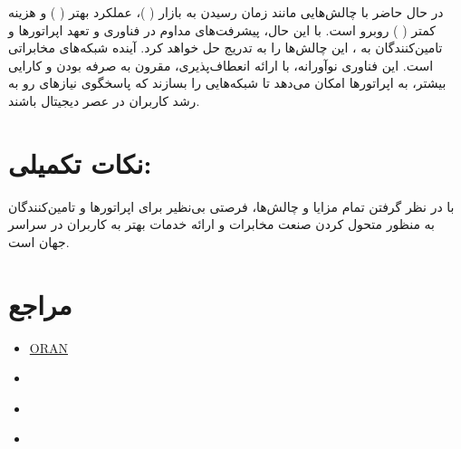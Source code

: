 \documentclass[landscape, 12pt]{report}
\begin{document}
 در حال حاضر با چالش‌هایی مانند زمان رسیدن به بازار (
 )، عملکرد بهتر (
 ) و هزینه کمتر (
 ) روبرو است. با این حال، پیشرفت‌های مداوم در فناوری و تعهد اپراتورها و تامین‌کنندگان به
  ، این چالش‌ها را به تدریج حل خواهد کرد.
 آینده شبکه‌های مخابراتی است. این فناوری نوآورانه، با ارائه انعطاف‌پذیری، مقرون به صرفه بودن و کارایی بیشتر، به اپراتورها امکان می‌دهد تا شبکه‌هایی را بسازند که پاسخگوی نیازهای رو به رشد کاربران در عصر دیجیتال باشند.
\section*{نکات تکمیلی:}

با در نظر گرفتن تمام مزایا و چالش‌ها،
   فرصتی بی‌نظیر برای اپراتورها و تامین‌کنندگان به منظور متحول کردن صنعت مخابرات و ارائه خدمات بهتر به کاربران در سراسر جهان است.

\section* {مراجع}
\begin{itemize}
	\item 
	\href{https://www.youtube.com/watch?v=Z9kJ8HT\_IVM} {ORAN}
	
	\item 
	\href{https://www.vmware.com/topics/glossary/content/vran-oran.html?resource=cat-1324900800#cat-1324900800}{}
	
	\item 
	\href{https://www.youtube.com/watch?v=\_Wd2zwdCQZI}{}
	
	\item 
	\href{https://www.youtube.com/watch?v=jYdfHSWbRBE}{}
\end{itemize}
\end{document}
